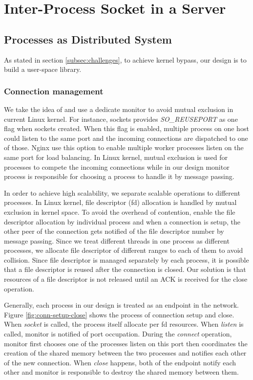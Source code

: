 \section{Inter-Process Socket in a Server}
\label{sec:intra-server}

\subsection{Processes as Distributed System}
\label{subsec:socket-api}
As stated in section \ref{subsec:challenges}, to achieve kernel bypass, our design is to build a user-space library.
\subsubsection{Connection management}

 We take the idea of \cite{roghanchi2017ffwd} and use a dedicate monitor to avoid mutual exclusion in current Linux kernel. For instance, sockets provides \textit{SO\_REUSEPORT} as one flag when sockets created. When this flag is enabled, multiple process on one host could listen to the same port and the incoming connections are dispatched to one of those. Nginx use this option to enable multiple worker processes listen on the same port for load balancing. In Linux kernel, mutual exclusion is used for processes to compete the incoming connections while in our design monitor process is responsible for choosing a process to handle it by message passing.

In order to achieve high scalability, we separate scalable operations to different processes. In Linux kernel, file descriptor (fd) allocation is handled by mutual exclusion in kernel space. To avoid the overhead of contention, \libipc enable the file descriptor allocation by individual process and when a connection is setup, the other peer of the connection gets notified of the file descriptor number by message passing. Since we treat different threads in one process as different processes, we allocate file descriptor of different ranges to each of them to avoid collision. Since file descriptor is managed separately by each process, it is possible that a file descriptor is reused after the connection is closed. Our solution is that resources of a file descriptor is not released until an ACK is received for the close operation.

Generally, each process in our design is treated as an endpoint in the network. Figure \ref{fig:conn-setup-close} shows the process of connection setup and close. When \textit{socket} is called, the process itself allocate per fd resources. When \textit{listen} is called, monitor is notified of port occupation. During the \textit{connect} operation, monitor first chooses one of the processes listen on this port then coordinates the creation of the shared memory between the two processes and notifies each other of the new connection. When \textit{close} happens, both of the endpoint notify each other and monitor is responsible to destroy the shared memory between them. 

